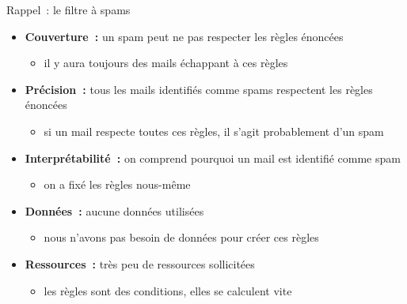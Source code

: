 \documentclass[serif, aspectratio=169]{beamer}
\begin{document}
\begin{frame}{Rappel~: le filtre à spams}
    \begin{itemize}
        \item \textbf{Couverture~:} un spam peut ne pas respecter les règles énoncées
        \begin{itemize}
            \item il y aura toujours des mails échappant à ces règles
        \end{itemize}
        \vfill
        \item \textbf{Précision~:} tous les mails identifiés comme spams respectent les règles énoncées
        \begin{itemize}
            \item si un mail respecte toutes ces règles, il s'agit probablement d'un spam
        \end{itemize}
        \vfill
        \item \textbf{Interprétabilité~:} on comprend pourquoi un mail est identifié comme spam
        \begin{itemize}
            \item on a fixé les règles nous-même
        \end{itemize}
        \vfill
        \item \textbf{Données~:} aucune données utilisées
        \begin{itemize}
            \item nous n'avons pas besoin de données pour créer ces règles
        \end{itemize}
        \vfill
        \item \textbf{Ressources~:} très peu de ressources sollicitées
        \begin{itemize}
            \item les règles sont des conditions, elles se calculent vite
        \end{itemize}
    \end{itemize}
\end{frame}
\end{document}
